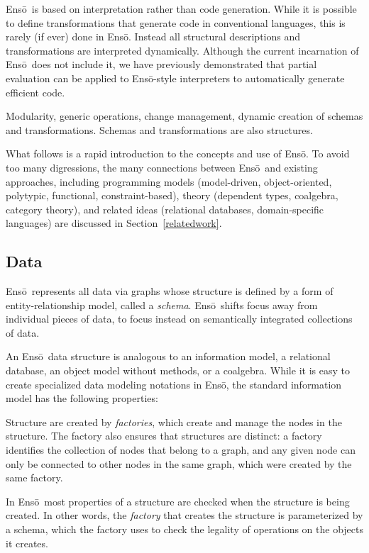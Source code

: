 \documentclass[11pt]{article}
\newcommand{\Enso}{Ens\={o}}
\begin{document}
\Enso\ is based on interpretation rather than code generation. 
While it is possible to define transformations that generate code
in conventional languages, this is rarely (if ever) done in \Enso.
Instead all structural descriptions and transformations are 
interpreted dynamically. Although the current incarnation of \Enso\
does not include it, we have previously demonstrated that partial
evaluation can be applied to \Enso-style interpreters to automatically
generate efficient code.

Modularity, generic operations, change management, dynamic creation
of schemas and transformations.
Schemas and transformations are also structures.

What follows is a rapid introduction to the concepts and use of
\Enso. To avoid too many digressions, 
the many connections between \Enso\ and existing approaches,
including programming models
(model-driven, object-oriented, polytypic, functional, constraint-based), theory (dependent types, coalgebra, category theory),
and related ideas (relational databases, domain-specific languages)
are discussed in Section~\ref{relatedwork}.



\subsection{Data}

\Enso\ represents all data via graphs whose structure is defined
by a form of entity-relationship model, called a \textit{schema}. 
\Enso\ shifts focus away from individual pieces of data, to focus instead
on semantically integrated collections of data. 

An \Enso\ data structure is analogous to an information model,
a relational database, an object model without methods, or a coalgebra.
While it is easy to create specialized data modeling notations
in \Enso, the standard information model has the following properties:

Structure are created by \textit{factories}, which create
and manage the nodes in the structure. The factory also
ensures that structures are distinct: a factory identifies the 
collection of nodes that belong to a graph, and any given node 
can only be connected to other nodes in the same graph, which were
created by the same factory.

In \Enso\ most properties of a structure are
checked when the structure is being created. In other words, 
the \textit{factory} that creates the structure is parameterized by a
schema, which the factory uses to check the legality of operations
on the objects it creates.
\end{document}
